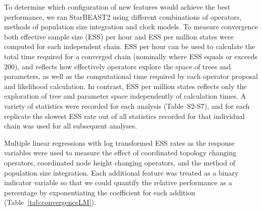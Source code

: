 \documentclass[12pt]{article}
\begin{document}
To determine which configuration of new features would achieve the best
performance, we ran StarBEAST2 using different combinations of operators,
methods of population size integration and clock models. To measure
convergence both effective sample size (ESS) per hour and ESS per million
states were computed for each independent chain. ESS per hour can be used to
calculate the total time required for a converged chain (nominally where ESS
equals or exceeds 200), and reflects how effectively operators explore the
space of trees and parameters, as well as the computational time required by
each operator proposal and likelihood calculation. In contrast, ESS per
million states reflects only the exploration of tree and parameter space
independently of calculation times. A variety of statistics were recorded for
each analysis (Table~S2-S7), and for each replicate the slowest ESS rate
out of all statistics recorded for that individual chain was used for all
subsequent analyses.

Multiple linear regressions with log transformed ESS rates as the response
variables were used to measure the effect of coordinated topology changing
operators, coordinated node height changing operators, and the method of
population size integration. Each additional feature was treated as a binary
indicator variable so that we could quantify the relative performance as a
percentage by exponentiating the coefficient for each addition
(Table~\ref{tab:convergenceLM}).
\end{document}
